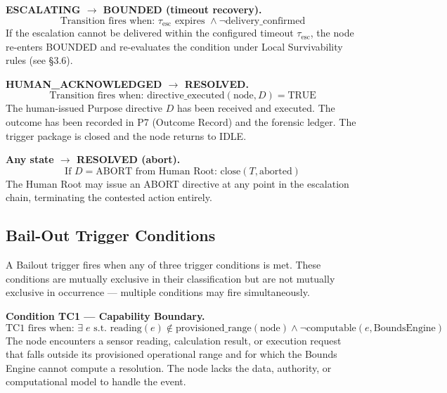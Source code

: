 \bigskip
\noindent\textbf{ESCALATING $\rightarrow$ BOUNDED (timeout recovery).}
\begin{equation}
\text{Transition fires when: } \tau_{\text{esc}} \text{ expires } \land \neg \text{delivery\_confirmed}
\end{equation}
If the escalation cannot be delivered within the configured timeout $\tau_{\text{esc}}$, the node re-enters BOUNDED and re-evaluates the condition under Local Survivability rules (see \S 3.6).

\bigskip
\noindent\textbf{HUMAN\_ACKNOWLEDGED $\rightarrow$ RESOLVED.}
\begin{equation}
\text{Transition fires when: } \text{directive\_executed}(\text{node}, D) = \text{TRUE}
\end{equation}
The human-issued Purpose directive $D$ has been received and executed. The outcome has been recorded in P7 (Outcome Record) and the forensic ledger. The trigger package is closed and the node returns to IDLE.

\bigskip
\noindent\textbf{Any state $\rightarrow$ RESOLVED (abort).}
\begin{equation}
\text{If } D = \text{ABORT} \text{ from Human Root: } \text{close}(T, \text{aborted})
\end{equation}
The Human Root may issue an ABORT directive at any point in the escalation chain, terminating the contested action entirely.

\subsection{Bail-Out Trigger Conditions}

A Bailout trigger fires when any of three trigger conditions is met. These conditions are mutually exclusive in their classification but are not mutually exclusive in occurrence — multiple conditions may fire simultaneously.

\bigskip
\noindent\textbf{Condition TC1 — Capability Boundary.}
\begin{equation}
\text{TC1 fires when: } \exists\; e \text{ s.t. } \text{reading}(e) \notin \text{provisioned\_range}(\text{node}) \land \neg \text{computable}(e, \text{BoundsEngine})
\end{equation}
The node encounters a sensor reading, calculation result, or execution request that falls outside its provisioned operational range and for which the Bounds Engine cannot compute a resolution. The node lacks the data, authority, or computational model to handle the event.

